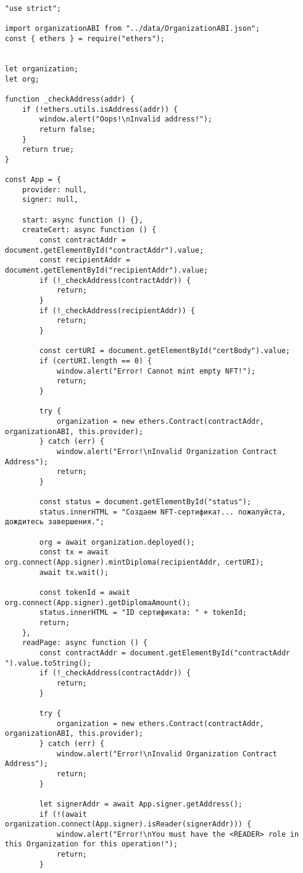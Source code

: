\begin{lstlisting}[caption=Создание и чтение сертификата с помощью клиентского приложения, label = list4, style=realcode]
"use strict";

import organizationABI from "../data/OrganizationABI.json";
const { ethers } = require("ethers");


let organization;
let org;

function _checkAddress(addr) {
	if (!ethers.utils.isAddress(addr)) {
		window.alert("Oops!\nInvalid address!");
		return false;
	}
	return true;
}

const App = {
	provider: null,
	signer: null,
	
	start: async function () {},
	createCert: async function () {
		const contractAddr = document.getElementById("contractAddr").value;
		const recipientAddr = document.getElementById("recipientAddr").value;
		if (!_checkAddress(contractAddr)) {
			return;
		}
		if (!_checkAddress(recipientAddr)) {
			return;
		}
		
		const certURI = document.getElementById("certBody").value;
		if (certURI.length == 0) {
			window.alert("Error! Cannot mint empty NFT!");
			return;
		}
		
		try {
			organization = new ethers.Contract(contractAddr, organizationABI, this.provider);
		} catch (err) {
			window.alert("Error!\nInvalid Organization Contract Address");
			return;
		}
		
		const status = document.getElementById("status");
		status.innerHTML = "Создаем NFT-сертификат... пожалуйста, дождитесь завершения.";
		
		org = await organization.deployed();
		const tx = await org.connect(App.signer).mintDiploma(recipientAddr, certURI);
		await tx.wait();
		
		const tokenId = await org.connect(App.signer).getDiplomaAmount();
		status.innerHTML = "ID сертификата: " + tokenId;
		return;
	},
	readPage: async function () {
		const contractAddr = document.getElementById("contractAddr ").value.toString();
		if (!_checkAddress(contractAddr)) {
			return;
		}
		
		try {
			organization = new ethers.Contract(contractAddr, organizationABI, this.provider);
		} catch (err) {
			window.alert("Error!\nInvalid Organization Contract Address");
			return;
		}
		
		let signerAddr = await App.signer.getAddress();
		if (!(await organization.connect(App.signer).isReader(signerAddr))) {
			window.alert("Error!\nYou must have the <READER> role in this Organization for this operation!");
			return;
		}
		

\end{lstlisting}
